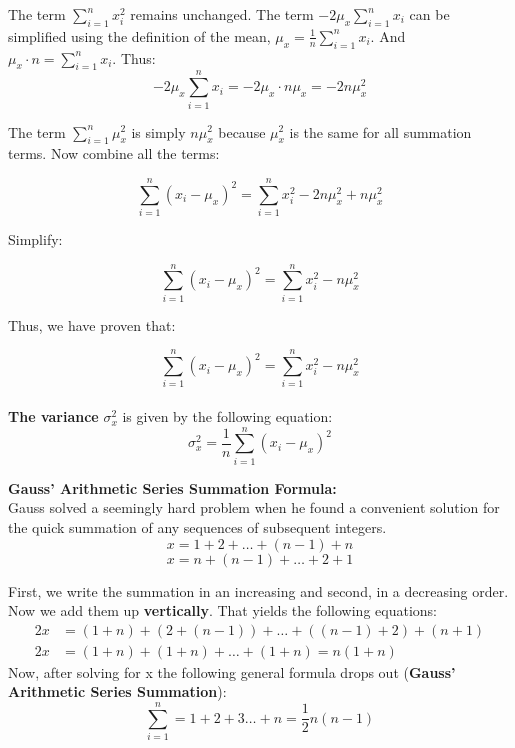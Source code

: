 \documentclass{article}
\begin{document}
The term \( \sum_{i=1}^{n} x_i^2 \) remains unchanged. The term \( -2\mu_x \sum_{i=1}^{n} x_i \) can be simplified using the definition of the mean, \( \mu_x = \frac{1}{n} \sum_{i=1}^{n} x_i \). And \( \mu_x \cdot n = \sum_{i=1}^{n} x_i \). Thus:
  \[
  -2\mu_x \sum_{i=1}^{n} x_i = -2\mu_x \cdot n \mu_x = -2n \mu_x^2
  \]
  
The term \( \sum_{i=1}^{n} \mu_x^2 \) is simply \( n \mu_x^2 \) because \( \mu_x^2 \) is the same for all summation terms. Now combine all the terms:

\[
\sum_{i=1}^{n} (x_i - \mu_x)^2 = \sum_{i=1}^{n} x_i^2 - 2n \mu_x^2 + n \mu_x^2
\]

Simplify:

\[
\sum_{i=1}^{n} (x_i - \mu_x)^2 = \sum_{i=1}^{n} x_i^2 - n \mu_x^2
\]

Thus, we have proven that:

\[
\sum_{i=1}^{n} (x_i - \mu_x)^2 = \sum_{i=1}^{n} x_i^2 - n \mu_x^2
\] \\
\textbf{The variance} \( \sigma_x^2 \) is given by the following equation:
\begin{equation}
    \sigma_x^2 = \frac{1}{n} \sum_{i=1}^{n} (x_i - \mu_x)^2
\end{equation} 

\vspace{1cm}

\textbf{Gauss' Arithmetic Series Summation Formula:}\\

Gauss solved a seemingly hard problem when he found a convenient solution for the quick summation of any sequences of subsequent integers. 
\[
x = 1 + 2 + \ldots + (n - 1) + n
\]
\[
x = n + (n - 1) + \ldots + 2 + 1
\]

First, we write the summation in an increasing and second, in a decreasing order. Now we add them up \textbf{vertically}. That yields the following equations: 
\begin{align*}
2x &= (1+n) + (2+(n-1)) + \ldots + ((n-1)+2) + (n+1) \\
2x &= (1 + n) + (1 + n) + \ldots + (1 + n) = n(1 + n)
\end{align*}
Now, after solving for x the following general formula drops out (\textbf{Gauss' Arithmetic Series Summation}): 
\begin{equation}
    \sum_{i=1}^{n} = 1 + 2 + 3 \ldots + n = \frac{1}{2}n(n - 1)
\end{equation} \\
\end{document}
